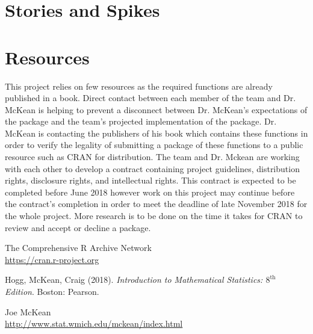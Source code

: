 \documentclass[12pt]{article}
\begin{document}
\section{Stories and Spikes}

\section{Resources}
This project relies on few resources as the required functions are already published in a book. Direct contact between each member of the team and Dr. McKean is helping to prevent a disconnect between Dr. McKean's expectations of the package and the team's projected implementation of the package. Dr. McKean is contacting the publishers of his book which contains these functions in order to verify the legality of submitting a package of these functions to a public resource such as CRAN for distribution. The team and Dr. Mckean are working with each other to develop a contract containing project guidelines, distribution rights, disclosure rights, and intellectual rights. This contract is expected to be completed before June 2018 however work on this project may continue before the contract's completion in order to meet the deadline of late November 2018 for the whole project. More research is to be done on the time it takes for CRAN to review and accept or decline a package.

\medskip

\begin{thebibliography}{9}
The Comprehensive R Archive Network\\
\url{https://cran.r-project.org}

Hogg, McKean, Craig (2018). \textit{Introduction to Mathematical Statistics: $8^\mathrm{th}$ Edition}. Boston: Pearson.

Joe McKean\\
\url{http://www.stat.wmich.edu/mckean/index.html}
\end{thebibliography}
\end{document}
